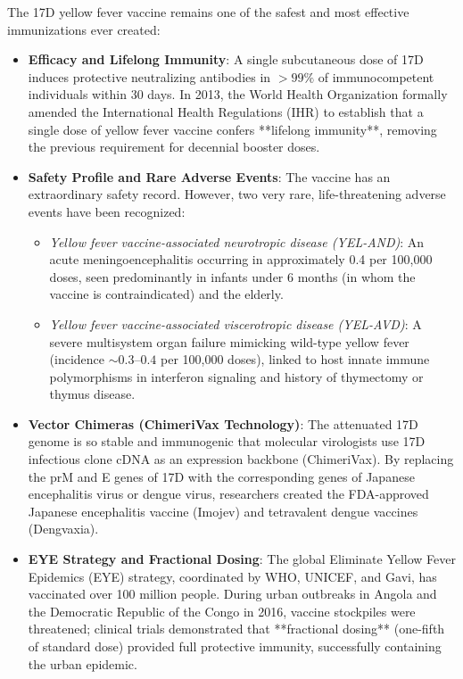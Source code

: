 The 17D yellow fever vaccine remains one of the safest and most effective immunizations ever created:
\begin{itemize}
    \item \textbf{Efficacy and Lifelong Immunity}: A single subcutaneous dose of 17D induces protective neutralizing antibodies in $>99\%$ of immunocompetent individuals within 30 days. In 2013, the World Health Organization formally amended the International Health Regulations (IHR) to establish that a single dose of yellow fever vaccine confers **lifelong immunity**, removing the previous requirement for decennial booster doses.
    \item \textbf{Safety Profile and Rare Adverse Events}: The vaccine has an extraordinary safety record. However, two very rare, life-threatening adverse events have been recognized:
      \begin{itemize}
          \item \emph{Yellow fever vaccine-associated neurotropic disease (YEL-AND)}: An acute meningoencephalitis occurring in approximately 0.4 per 100,000 doses, seen predominantly in infants under 6 months (in whom the vaccine is contraindicated) and the elderly.
          \item \emph{Yellow fever vaccine-associated viscerotropic disease (YEL-AVD)}: A severe multisystem organ failure mimicking wild-type yellow fever (incidence $\sim 0.3\text{--}0.4$ per 100,000 doses), linked to host innate immune polymorphisms in interferon signaling and history of thymectomy or thymus disease.
      \end{itemize}
    \item \textbf{Vector Chimeras (ChimeriVax Technology)}: The attenuated 17D genome is so stable and immunogenic that molecular virologists use 17D infectious clone cDNA as an expression backbone (ChimeriVax). By replacing the prM and E genes of 17D with the corresponding genes of Japanese encephalitis virus or dengue virus, researchers created the FDA-approved Japanese encephalitis vaccine (Imojev) and tetravalent dengue vaccines (Dengvaxia).
    \item \textbf{EYE Strategy and Fractional Dosing}: The global Eliminate Yellow Fever Epidemics (EYE) strategy, coordinated by WHO, UNICEF, and Gavi, has vaccinated over 100 million people. During urban outbreaks in Angola and the Democratic Republic of the Congo in 2016, vaccine stockpiles were threatened; clinical trials demonstrated that **fractional dosing** (one-fifth of standard dose) provided full protective immunity, successfully containing the urban epidemic.
\end{itemize}

